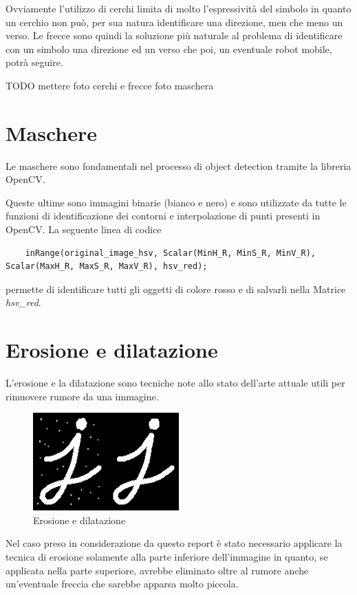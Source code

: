 Ovviamente l'utilizzo di cerchi limita di molto l'espressività del simbolo in quanto un cerchio non può, per sua natura identificare una direzione, men che meno un verso.
Le frecce sono quindi la soluzione più naturale al problema di identificare con un simbolo una direzione ed un verso che poi, un eventuale robot mobile, potrà seguire.

TODO mettere foto cerchi e frecce
foto maschera

\section{Maschere}
Le maschere sono fondamentali nel processo di object detection tramite la libreria OpenCV.

Queste ultime sono immagini binarie (bianco e nero) e sono utilizzate da tutte le funzioni di identificazione dei contorni e interpolazione di punti presenti in OpenCV.
La seguente linea di codice

\begin{lstlisting}
	inRange(original_image_hsv, Scalar(MinH_R, MinS_R, MinV_R), Scalar(MaxH_R, MaxS_R, MaxV_R), hsv_red);
\end{lstlisting}

permette di identificare tutti gli oggetti di colore rosso e di salvarli nella Matrice \textit{hsv\_red}.

\section{Erosione e dilatazione}
L'erosione e la dilatazione sono tecniche note allo stato dell'arte attuale utili per rimuovere rumore da una immagine.

\begin{figure}[H]
	\centering
	\includegraphics[width=0.5\textwidth]{Immagini/erosion_dil.png}
	\caption{Erosione e dilatazione}
	\label{fig:erosion_dil}
\end{figure}

Nel caso preso in considerazione da questo report è stato necessario applicare la tecnica di erosione solamente alla parte inferiore dell'immagine in quanto, se applicata nella parte superiore, avrebbe eliminato oltre al rumore anche un'eventuale freccia che sarebbe apparsa molto piccola.